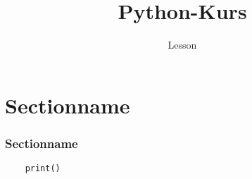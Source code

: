 \documentclass[]{tudbeamer}
\title{Python-Kurs}
\subtitle{Lesson}
\begin{document}
\maketitle

\begin{frame}
\tableofcontents
\end{frame}

\section{Sectionname}
\begin{frame}
\frametitle{Sectionname}
\begin{lstlisting}
	print()
\end{lstlisting}
	
\end{frame}
\end{document}
